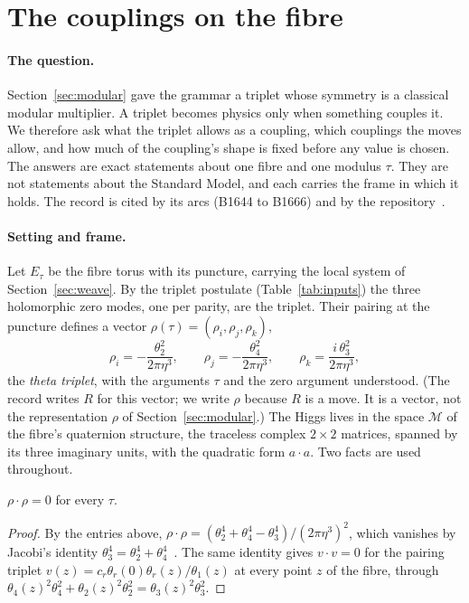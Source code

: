 \section{The couplings on the fibre}\label{sec:couplings}

\paragraph{The question.}
Section~\ref{sec:modular} gave the grammar a triplet whose symmetry is a classical modular multiplier. A triplet
becomes physics only when something couples it. We therefore ask what the triplet allows as a coupling, which couplings
the moves allow, and how much of the coupling's shape is fixed before any value is chosen. The answers are exact
statements about one fibre and one modulus $\tau$. They are not statements about the Standard Model, and each carries
the frame in which it holds. The record is cited by its arcs (B1644 to B1666) and by the repository~\cite{OriginAxiomRepo}.

\paragraph{Setting and frame.}
Let $E_\tau$ be the fibre torus with its puncture, carrying the local system of Section~\ref{sec:weave}. By the triplet
postulate (Table~\ref{tab:inputs}) the three holomorphic zero modes, one per parity, are the triplet. Their pairing at
the puncture defines a vector $\rho(\tau)=(\rho_i,\rho_j,\rho_k)$,
\[
  \rho_i=-\frac{\theta_2^2}{2\pi\eta^3},\qquad
  \rho_j=-\frac{\theta_4^2}{2\pi\eta^3},\qquad
  \rho_k=\frac{i\,\theta_3^2}{2\pi\eta^3},
\]
the \emph{theta triplet}, with the arguments $\tau$ and the zero argument understood. (The record writes $R$ for this
vector; we write $\rho$ because $R$ is a move. It is a vector, not the representation $\rho$ of Section~\ref{sec:modular}.) The Higgs lives in the space $\mathcal M$ of the fibre's quaternion
structure, the traceless complex $2\times2$ matrices, spanned by its three imaginary units, with the quadratic form
$a\cdot a$. Two facts are
used throughout.

\begin{lemma}[Jacobi]\label{lem:jacobi}
$\rho\cdot\rho=0$ for every $\tau$.
\end{lemma}
\begin{proof}
By the entries above, $\rho\cdot\rho=(\theta_2^4+\theta_4^4-\theta_3^4)/(2\pi\eta^3)^2$, which
vanishes by Jacobi's identity $\theta_3^4=\theta_2^4+\theta_4^4$~\cite{WhittakerWatson1927}. The same identity gives
$v\cdot v=0$ for the pairing triplet $v(z)=c_r\theta_r(0)\theta_r(z)/\theta_1(z)$ at every point $z$ of the fibre,
through $\theta_4(z)^2\theta_4^2+\theta_2(z)^2\theta_2^2=\theta_3(z)^2\theta_3^2$.
\end{proof}

